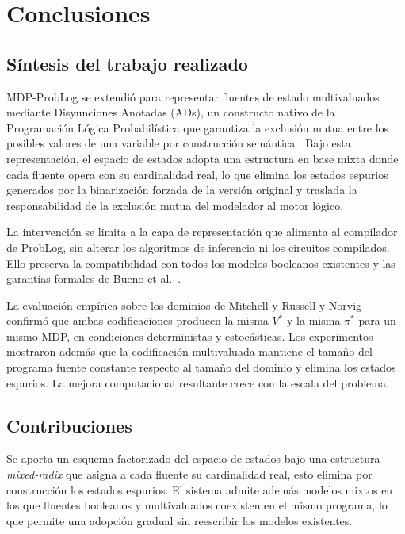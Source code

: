 
\section{Conclusiones}
\label{sec:conclusiones}

\subsection{Síntesis del trabajo realizado}
\label{sec:conclusiones-sintesis}

MDP-ProbLog se extendió para representar fluentes de estado multivaluados
mediante Disyunciones Anotadas (ADs), un constructo nativo de la
Programación Lógica Probabilística que garantiza la exclusión mutua entre
los posibles valores de una variable por construcción semántica
\cite{vennekens2004lpads}. Bajo esta representación, el espacio de estados
adopta una estructura en base mixta donde cada fluente opera con su
cardinalidad real, lo que elimina los estados espurios generados por la
binarización forzada de la versión original y traslada la responsabilidad
de la exclusión mutua del modelador al motor lógico.

La intervención se limita a la capa de representación que alimenta al
compilador de ProbLog, sin alterar los algoritmos de inferencia ni los
circuitos compilados. Ello preserva la compatibilidad con todos los modelos
booleanos existentes y las garantías formales de Bueno et al.\
\cite{bueno2016mdp}.

La evaluación empírica sobre los dominios de Mitchell \cite{mitchell1997machine}
y Russell y Norvig \cite{russell2016artificial} confirmó que ambas
codificaciones producen la misma $V^*$ y la misma $\pi^*$ para un mismo
MDP, en condiciones deterministas y estocásticas. Los experimentos mostraron
además que la codificación multivaluada mantiene el tamaño del programa
fuente constante respecto al tamaño del dominio y elimina los estados
espurios. La mejora computacional resultante crece con la escala del
problema.

\subsection{Contribuciones}
\label{sec:conclusiones-contribuciones}

Se aporta un esquema factorizado del espacio de estados bajo una
estructura \textit{mixed-radix} que asigna a cada fluente su cardinalidad
real, esto elimina por construcción los estados espurios. El sistema admite además modelos mixtos en los
que fluentes booleanos y multivaluados coexisten en el mismo programa, lo
que permite una adopción gradual sin reescribir los modelos existentes.

